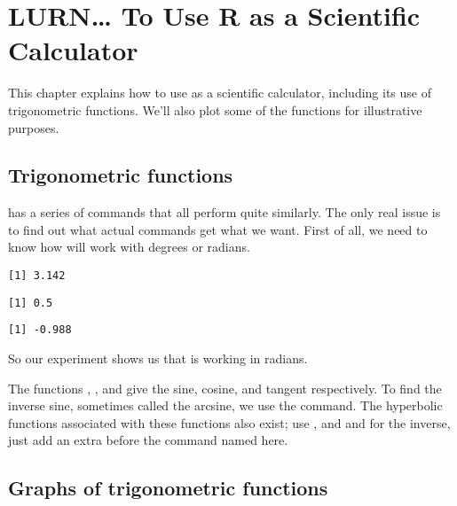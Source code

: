 

\chapter{LURN\ldots{} To Use R as a Scientific Calculator} 
\label{ScientificCalculator} 
 

 
This chapter explains how to use \R{} as a scientific calculator, including its use of trigonometric functions. We'll also plot some of the functions for illustrative purposes.  
 
\section{Trigonometric functions} 
 
\R{} has a series of commands that all perform quite similarly. The only real issue is to find out what actual commands get what we want. First of all, we need to know how \R{} will work with degrees or radians. 
\begin{knitrout}
\color{fgcolor}\begin{kframe}
\begin{alltt}
\hlstd{> }
\end{alltt}
\begin{verbatim}
[1] 3.142
\end{verbatim}
\begin{alltt}
\hlstd{> }\hlopt{/}\hlstd{)}
\end{alltt}
\begin{verbatim}
[1] 0.5
\end{verbatim}
\begin{alltt}
\hlstd{> }\hlstd{(}\hlstd{)}
\end{alltt}
\begin{verbatim}
[1] -0.988
\end{verbatim}
\end{kframe}
\end{knitrout}
So our experiment shows us that \R{} is working in radians. 
 
The functions , , and  give the sine, cosine, and tangent respectively. To find the inverse sine, sometimes called the arcsine, we use the  command. The hyperbolic functions associated with these functions also exist; use ,  and  and for the inverse, just add an extra  before the command named here. 
 
\section{Graphs of trigonometric functions} 
 
 


